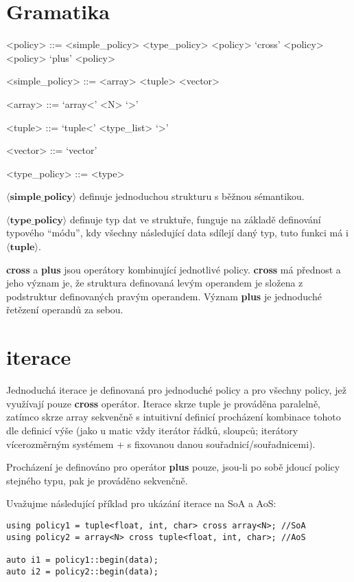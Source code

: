\documentclass[a4paper,12pt]{article}
\begin{document}
    \section{Gramatika}

    \begin{grammar}
        <policy> ::= <simple_policy>
        \alt <type_policy>
        \alt <policy> `cross' <policy>
        \alt <policy> `plus' <policy>

        <simple_policy> ::= <array>
        \alt <tuple>
        \alt <vector>

        <array> ::= `array<' <N> `>'

        <tuple> ::= `tuple<' <type_list> `>'

        <vector> ::= `vector'

        <type_policy> ::= <type>
    \end{grammar}

    $\mathbf{\langle simple\_policy \rangle}$ definuje jednoduchou strukturu s běžnou sémantikou.

    $\mathbf{\langle type\_policy \rangle}$ definuje typ dat ve struktuře, funguje na základě definování typového ``módu'', kdy všechny následující data sdílejí daný typ, tuto funkci má i $\mathbf{\langle tuple \rangle}$.

    \textbf{cross} a \textbf{plus} jsou operátory kombinující jednotlivé policy.
    \textbf{cross} má přednost a jeho význam je, že struktura definovaná levým operandem je složena z podstruktur definovaných pravým operandem. Význam \textbf{plus} je jednoduché řetězení operandů za sebou.

    \section{iterace}

    Jednoduchá iterace je definovaná pro jednoduché policy a pro všechny policy, jež využívají pouze \textbf{cross} operátor. Iterace skrze tuple je prováděna paralelně, zatímco skrze array sekvenčně s intuitivní definicí procházení kombinace tohoto dle definicí výše (jako u matic vždy iterátor řádků, sloupců; iterátory vícerozměrným systémem + s fixovanou danou souřadnicí/souřadnicemi).

    Procházení je definováno pro operátor \textbf{plus} pouze, jsou-li po sobě jdoucí policy stejného typu, pak je prováděno sekvenčně.

    Uvažujme následující příklad pro ukázání iterace na SoA a AoS:
    \begin{lstlisting}
using policy1 = tuple<float, int, char> cross array<N>; //SoA
using policy2 = array<N> cross tuple<float, int, char>; //AoS

auto i1 = policy1::begin(data);
auto i2 = policy2::begin(data);
    \end{lstlisting}
\end{document}
